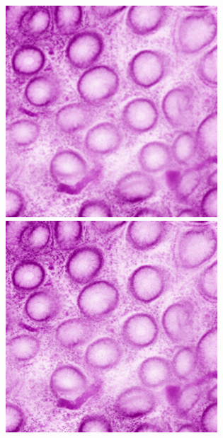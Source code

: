 \begin{figure}[H]
	\centering
	
	\begin{minipage}{0.24\columnwidth}
		\centering
		\includegraphics[clip, width=\linewidth]{fig/preprocessing/data_aug/color/SHARPNESS/SHARPNESS_0_00}
	\end{minipage}
	\begin{minipage}{0.24\columnwidth}
		\centering
		\includegraphics[clip, width=\linewidth]{fig/preprocessing/data_aug/color/SHARPNESS/SHARPNESS_0_50}

\end{minipage}
\end{figure}
